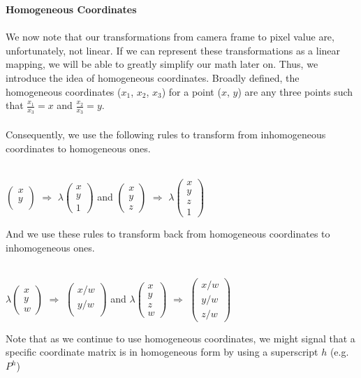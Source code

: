 \documentclass[]{article}
\begin{document}
\textbf{Homogeneous Coordinates}\\\\
We now note that our transformations from camera frame to pixel value are, unfortunately, not linear. If we can represent these transformations as a linear mapping, we will be able to greatly simplify our math later on. Thus, we introduce the idea of homogeneous coordinates. Broadly defined, the homogeneous coordinates ($x_1$, $x_2$, $x_3$) for a point ($x$, $y$) are any three points such that $\frac{x_1}{x_3} = x$ and $\frac{x_2}{x_3} = y$.\\\\ Consequently, we use the following rules to transform from inhomogeneous coordinates to homogeneous ones.\\\\
\begin{center}
$\begin{pmatrix}
x \\
y \\
\end{pmatrix}
$
$\Rightarrow$
$\lambda\begin{pmatrix}
x \\
y \\
1
\end{pmatrix}
$
and
$\begin{pmatrix}
x \\
y \\
z
\end{pmatrix}
$
$\Rightarrow$
$\lambda\begin{pmatrix}
x \\
y \\
z \\
1
\end{pmatrix}
$
\end{center}
And we use these rules to transform back from homogeneous coordinates to inhomogeneous ones. \\\\
\begin{center}
$\lambda\begin{pmatrix}
x \\
y \\
w
\end{pmatrix}
$
$\Rightarrow$
$\begin{pmatrix}
x/w \\
y/w \\
\end{pmatrix}
$
and
$\lambda\begin{pmatrix}
x \\
y \\
z \\
w
\end{pmatrix}
$
$\Rightarrow$
$\begin{pmatrix}
x/w \\
y/w \\
z/w
\end{pmatrix}
$
\end{center}
Note that as we continue to use homogeneous coordinates, we might signal that a specific coordinate matrix is in homogeneous form by using a superscript $h$ (e.g. $P^h$)
\end{document}
